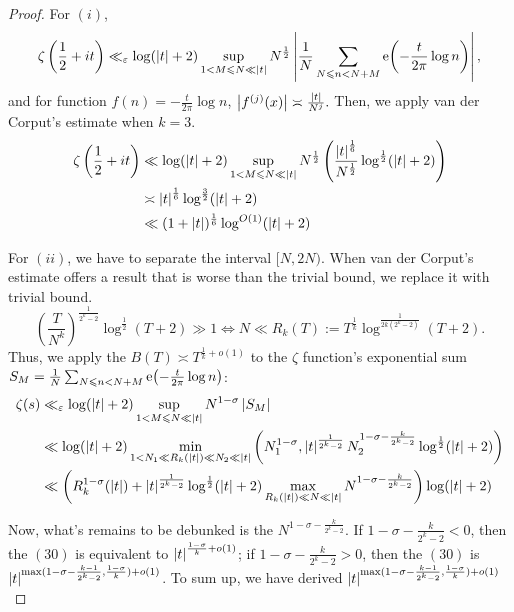 \begin{proof} For $(i)$,
$$\zeta \left( \frac{1}{2}+it \right) \ll_\varepsilon \log(\left\lvert t \right\rvert+2) \sup_{1 < M \leqslant N \ll \left\lvert t \right\rvert} N^\frac{1}{2} \left\lvert \frac{1}{N} \sum_{N \leqslant n < N+M} \operatorname{e} \! \left( -\frac{t}{2\pi}\log n \right) \right\rvert,$$ and for function $f(n) = -\frac{t}{2\pi}\log n$, $\left\lvert f^{(j)}(x) \right\rvert \asymp \frac{\left\lvert t \right\rvert}{N^j}.$ Then, we apply van der Corput's estimate when $k = 3$.
\begin{align*}
    \zeta \left( \frac{1}{2}+it \right) &\ll \log(\left\lvert t \right\rvert+2) \sup_{1 < M \leqslant N \ll \left\lvert t \right\rvert} N^\frac{1}{2} \left( \frac{\left\lvert t \right\rvert^\frac{1}{6}}{N^\frac{1}{2}} \log^\frac{1}{2}(\left\lvert t \right\rvert + 2) \right) \\
    &\asymp \left\lvert t \right\rvert^\frac{1}{6} \log^\frac{3}{2}(\left\lvert t \right\rvert+2) \\
    &\ll (1 + \left\lvert t \right\rvert)^\frac{1}{6} \log^{O(1)}(\left\lvert t \right\rvert+2)
\end{align*}

For $(ii)$, we have to separate the interval $[N, 2N)$. When van der Corput's estimate offers a result that is worse than the trivial bound, we replace it with trivial bound. $$\left( \frac{T}{N^k} \right)^\frac{1}{2^k-2} \log^\frac{1}{2}(T+2) \gg 1 \Longleftrightarrow N \ll R_k(T) := T^\frac{1}{k} \log^\frac{1}{2k(2^k-2)}(T+2).$$ Thus, we apply the $B(T) \asymp T^{\frac{1}{k}+o(1)}$ to the $\zeta$ function's exponential sum $S_M = \frac{1}{N} \sum_{N \leqslant n < N+M} \operatorname{e} \! \left( -\frac{t}{2\pi}\log n \right)$: 
\begin{align}
    \zeta(s) &\ll_\varepsilon \log(\left\lvert t \right\rvert+2) \sup_{1 < M \leqslant N \ll \left\lvert t \right\rvert} N^{1-\sigma} \left\lvert S_M \right\rvert \\
    &\ll \log(\left\lvert t \right\rvert+2) \min_{1 < N_1 \ll R_k(\left\lvert t \right\rvert) \ll N_2 \ll \left\lvert t \right\rvert} \left( N_1^{1-\sigma}, \left\lvert t \right\rvert^\frac{1}{2^k-2} N_2^{1-\sigma-\frac{k}{2^k-2}} \log^\frac{1}{2}(\left\lvert t \right\rvert+2) \right) \\ 
    &\ll \left( R_k^{1-\sigma}(\left\lvert t \right\rvert) + \left\lvert t \right\rvert^{\frac{1}{2^k-2}} \log^\frac{1}{2}(\left\lvert t \right\rvert+2) \max_{R_k(\left\lvert t \right\rvert) \ll N \ll \left\lvert t \right\rvert} N^{1-\sigma-\frac{k}{2^k-2}} \right) \log(\left\lvert t \right\rvert+2)
\end{align}

Now, what's remains to be debunked is the $N^{1-\sigma-\frac{k}{2^k-2}}.$ If $1-\sigma-\frac{k}{2^k-2} < 0$, then the $(30)$ is equivalent to $\left\lvert t \right\rvert^{\frac{1-\sigma}{k}+o(1)}$; if $1-\sigma-\frac{k}{2^k-2} > 0$, then the $(30)$ is $\left\lvert t \right\rvert^{\max(1-\sigma-\frac{k-1}{2^k-2}, \frac{1-\sigma}{k})+o(1)}$. To sum up, we have derived $\left\lvert t \right\rvert^{\max(1-\sigma-\frac{k-1}{2^k-2}, \frac{1-\sigma}{k})+o(1)}$
\end{proof}

